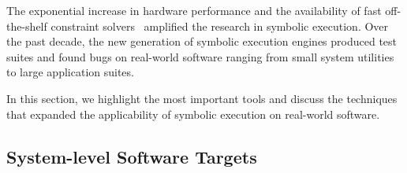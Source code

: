 The exponential increase in hardware performance and the availability of fast off-the-shelf constraint solvers~\cite{chaff,minisat,stp,Z3,cvc} amplified the research in symbolic execution.  Over the past decade, the new generation of symbolic execution engines produced test suites and found bugs on real-world software ranging from small system utilities to large application suites.

In this section, we highlight the most important tools and discuss the techniques that expanded the applicability of symbolic execution on real-world software.

\subsection{System-level Software Targets}





